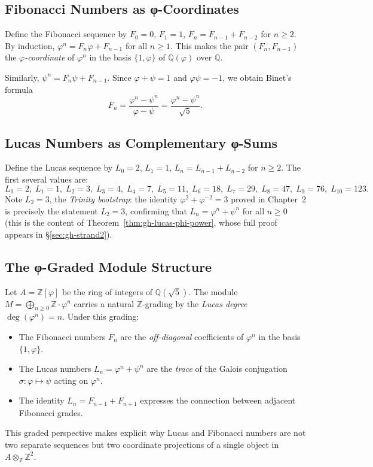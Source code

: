 \subsection{Fibonacci Numbers as φ-Coordinates}
\label{subsec:gh-fibcoords}

Define the Fibonacci sequence by \(F_0 = 0\), \(F_1 = 1\),
\(F_n = F_{n-1} + F_{n-2}\) for \(n \geq 2\).
By induction, \(\varphi^n = F_n \varphi + F_{n-1}\) for all \(n \geq 1\).
This makes the pair \((F_n, F_{n-1})\) the \emph{\(\varphi\)-coordinate}
of \(\varphi^n\) in the basis \(\{1, \varphi\}\) of
\(\mathbb{Q}(\varphi)\) over \(\mathbb{Q}\).

Similarly, \(\psi^n = F_n \psi + F_{n-1}\).
Since \(\varphi + \psi = 1\) and \(\varphi\psi = -1\),
we obtain Binet's formula
\begin{equation}\label{eq:gh-binet-fib}
  F_n = \frac{\varphi^n - \psi^n}{\varphi - \psi}
      = \frac{\varphi^n - \psi^n}{\sqrt{5}}.
\end{equation}

\subsection{Lucas Numbers as Complementary φ-Sums}
\label{subsec:gh-lucassum}

Define the Lucas sequence by \(L_0 = 2\), \(L_1 = 1\),
\(L_n = L_{n-1} + L_{n-2}\) for \(n \geq 2\).
The first several values are:
\[
  L_0=2,\; L_1=1,\; L_2=3,\; L_3=4,\; L_4=7,\; L_5=11,\;
  L_6=18,\; L_7=29,\; L_8=47,\; L_9=76,\; L_{10}=123.
\]
Note \(L_2 = 3\), the \emph{Trinity bootstrap}: the identity
\(\varphi^2 + \varphi^{-2} = 3\) proved in Chapter~2 is precisely the
statement \(L_2 = 3\), confirming that \(L_n = \varphi^n + \psi^n\)
for all \(n \geq 0\) (this is the content of
Theorem~\ref{thm:gh-lucas-phi-power}, whose full proof appears in
\S\ref{sec:gh-strand2}).

\subsection{The φ-Graded Module Structure}
\label{subsec:gh-graded}

Let \(A = \mathbb{Z}[\varphi]\) be the ring of integers of
\(\mathbb{Q}(\sqrt{5})\).  The module
\(M = \bigoplus_{n \geq 0} \mathbb{Z} \cdot \varphi^n\)
carries a natural \(\mathbb{Z}\)-grading by the \emph{Lucas degree}
\(\deg(\varphi^n) = n\).  Under this grading:
\begin{itemize}
  \item The Fibonacci numbers \(F_n\) are the \emph{off-diagonal}
        coefficients of \(\varphi^n\) in the basis \(\{1,\varphi\}\).
  \item The Lucas numbers \(L_n = \varphi^n + \psi^n\) are the
        \emph{trace} of the Galois conjugation
        \(\sigma: \varphi \mapsto \psi\) acting on \(\varphi^n\).
  \item The identity \(L_n = F_{n-1} + F_{n+1}\) expresses the
        connection between adjacent Fibonacci grades.
\end{itemize}
This graded perspective makes explicit why Lucas and Fibonacci numbers
are not two separate sequences but two coordinate projections of a
single object in \(A \otimes_{\mathbb{Z}} \mathbb{Z}^2\).

